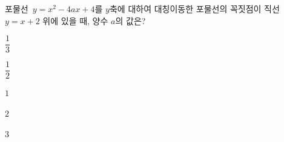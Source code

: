 포물선~$y=x^2-4ax+4$를 $y$축에 대하여 대칭이동한 포물선의 꼭짓점이 직선~$y=x+2$ 위에 있을 때, 양수 $a$의 값은?
\begin{choices32}{\rule[-3ex]{0pt}{8ex}$\dfrac{1}{3}$}{\rule[-3ex]{0pt}{8ex}$\dfrac{1}{2}$}{\rule[-3ex]{0pt}{8ex}$1$}{\rule[-3ex]{0pt}{8ex}$2$}{\rule[-3ex]{0pt}{8ex}$3$}\end{choices32}
